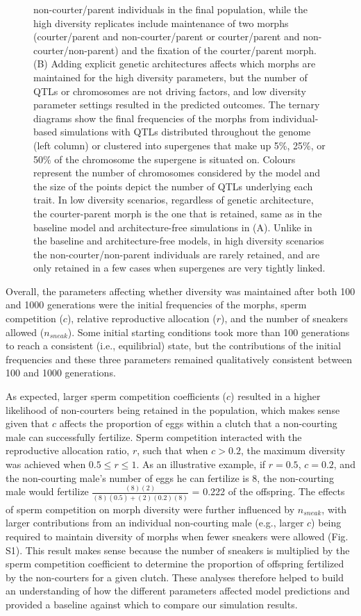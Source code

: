 \documentclass[
  11pt,
  a4paper,
]{article}
\begin{document}
\begin{figure}[H]
{non-courter/parent individuals in the final population, while the high
diversity replicates include maintenance of two morphs (courter/parent
and non-courter/parent or courter/parent and non-courter/non-parent) and
the fixation of the courter/parent morph. (B) Adding explicit genetic
architectures affects which morphs are maintained for the high diversity
parameters, but the number of QTLs or chromosomes are not driving
factors, and low diversity parameter settings resulted in the predicted
outcomes. The ternary diagrams show the final frequencies of the morphs
from individual-based simulations with QTLs distributed throughout the
genome (left column) or clustered into supergenes that make up 5\%, 25\%,
or 50\% of the chromosome the supergene is situated on. Colours represent
the number of chromosomes considered by the model and the size of the
points depict the number of QTLs underlying each trait. In low diversity
scenarios, regardless of genetic architecture, the courter-parent morph
is the one that is retained, same as in the baseline model and
architecture-free simulations in (A). Unlike in the baseline and
architecture-free models, in high diversity scenarios the
non-courter/non-parent individuals are rarely retained, and are only
retained in a few cases when supergenes are very tightly linked.}\label{fig:ternaryPlots}
\end{figure}

Overall, the parameters affecting whether diversity was maintained after
both 100 and 1000 generations were the initial frequencies of the
morphs, sperm competition (\(c\)), relative reproductive allocation (\(r\)),
and the number of sneakers allowed (\(n_{sneak}\)). Some initial starting
conditions took more than 100 generations to reach a consistent (i.e.,
equilibrial) state, but the contributions of the initial frequencies and
these three parameters remained qualitatively consistent between 100 and
1000 generations.

As expected, larger sperm competition coefficients (\(c\)) resulted in a
higher likelihood of non-courters being retained in the population,
which makes sense given that \(c\) affects the proportion of eggs within a
clutch that a non-courting male can successfully fertilize. Sperm
competition interacted with the reproductive allocation ratio, \(r\), such
that when \(c>0.2\), the maximum diversity was achieved when
\(0.5 \le r \le 1\). As an illustrative example, if \(r = 0.5\), \(c=0.2\),
and the non-courting male's number of eggs he can fertilize is 8, the
non-courting male would fertilize
\(\frac{(8)(2)}{(8) ( 0.5)+(2 )( 0.2 )( 8)}\) =
0.222 of the offspring. The effects of
sperm competition on morph diversity were further influenced by
\(n_{sneak}\), with larger contributions from an individual non-courting
male (e.g., larger \(c\)) being required to maintain diversity of morphs
when fewer sneakers were allowed (Fig. S1). This result makes sense
because the number of sneakers is multiplied by the sperm competition
coefficient to determine the proportion of offspring fertilized by the
non-courters for a given clutch. These analyses therefore helped to
build an understanding of how the different parameters affected model
predictions and provided a baseline against which to compare our
simulation results.
\end{document}
